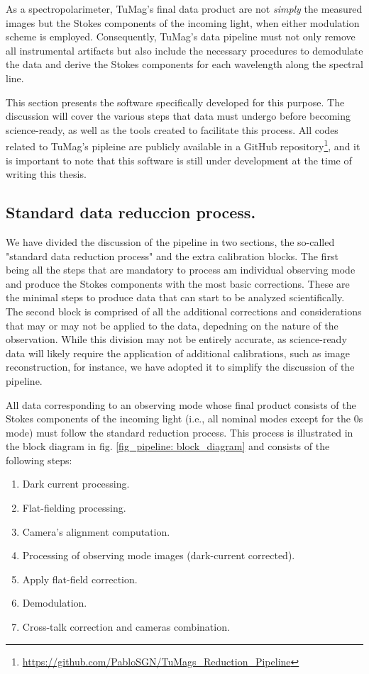 As a spectropolarimeter, TuMag's final data product are not \textit{simply} the measured images but the Stokes components of the incoming light, when either modulation scheme is employed. Consequently, TuMag's data pipeline must not only remove all instrumental artifacts but also include the necessary procedures to demodulate the data and derive the Stokes components for each wavelength along the spectral line.

This section presents the software specifically developed for this purpose. The discussion will cover the various steps that data must undergo before becoming science-ready, as well as the tools created to facilitate this process. All codes related to TuMag's pipleine are publicly available in a GitHub repository\footnote{\url{https://github.com/PabloSGN/TuMags_Reduction_Pipeline}}, and it is important to note that this software is still under development at the time of writing this thesis.

\subsection{Standard data reduccion process.}

We have divided the discussion of the pipeline in two sections, the so-called "standard data reduction process" and the extra calibration blocks. The first being all the steps that are mandatory to process am individual observing mode and produce the Stokes components with the most basic corrections. These are the minimal steps to produce data that can start to be analyzed scientifically. The second block is comprised of all the additional corrections and considerations that may or may not be applied to the data, depedning on the nature of the observation. While this division may not be entirely accurate, as science-ready data will likely require the application of additional calibrations, such as image reconstruction, for instance, we have adopted it to simplify the discussion of the pipeline.

All data corresponding to an observing mode whose final product consists of the Stokes components of the incoming light (i.e., all nominal modes except for the 0s mode) must follow the standard reduction process. This process is illustrated in the block diagram in fig. \ref{fig_pipeline: block_diagram} and consists of the following steps:
\begin{enumerate}
  \item Dark current processing. 
  \item Flat-fielding processing.
  \item Camera's alignment computation. 
  \item Processing of observing mode images (dark-current corrected). 
  \item Apply flat-field correction.
  \item Demodulation. 
  \item Cross-talk correction and cameras combination.
  \end{enumerate}

